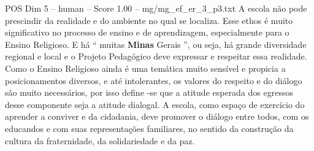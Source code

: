 \begin{textsample}{POS Dim 5 – human – Score 1.00 – mg/mg\_ef\_er\_3\_p3.txt}  \label{ex:f5_pos_003}
A escola não pode prescindir da realidade e do ambiente no qual se localiza.
Esse ethos é muito significativo no processo de ensino e de aprendizagem, especialmente para o Ensino Religioso.
E há “ muitas \textbf{Minas} Gerais ”, ou seja, há grande diversidade regional e local e o Projeto Pedagógico deve expressar e respeitar essa realidade.
Como o Ensino Religioso ainda é uma temática muito sensível e propicia a posicionamentos diversos, e até intolerantes, os valores do respeito e do diálogo são muito necessários, por isso define -se que a atitude esperada dos egressos desse componente seja a atitude dialogal.
A escola, como espaço de exercício do aprender a conviver e da cidadania, deve promover o diálogo entre todos, com os educandos e com suas representações familiares, no sentido da construção da cultura da fraternidade, da solidariedade e da paz.

\end{textsample}
